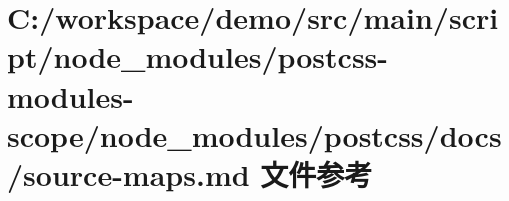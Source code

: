 \hypertarget{postcss-modules-scope_2node__modules_2postcss_2docs_2source-maps_8md}{}\section{C\+:/workspace/demo/src/main/script/node\+\_\+modules/postcss-\/modules-\/scope/node\+\_\+modules/postcss/docs/source-\/maps.md 文件参考}
\label{postcss-modules-scope_2node__modules_2postcss_2docs_2source-maps_8md}

